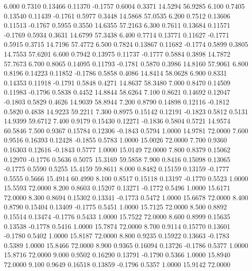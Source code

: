   6.000   0.7310   0.13466   0.11370  -0.1757   0.6004   0.3371  14.5294  56.9285
   6.100   0.7405   0.13540   0.11439  -0.1761   0.5977   0.3448  14.5868  57.0535
   6.200   0.7512   0.13606   0.11513  -0.1767   0.5955   0.3550  14.6355  57.2163
   6.300   0.7611   0.13684   0.11571  -0.1769   0.5934   0.3631  14.6799  57.3438
   6.400   0.7714   0.13771   0.11627  -0.1771   0.5915   0.3715  14.7196  57.4772
   6.500   0.7824   0.13867   0.11682  -0.1774   0.5899   0.3805  14.7553  57.6201
   6.600   0.7942   0.13975   0.11737  -0.1777   0.5884   0.3898  14.7872  57.7673
   6.700   0.8065   0.14095   0.11793  -0.1781   0.5870   0.3986  14.8160  57.9061
   6.800   0.8196   0.14223   0.11852  -0.1786   0.5858   0.4086  14.8414  58.0628
   6.900   0.8331   0.14353   0.11918  -0.1791   0.5848   0.4271  14.8637  58.3480
   7.000   0.8470   0.14509   0.11983  -0.1796   0.5838   0.4452  14.8844  58.6264
   7.100   0.8621   0.14692   0.12047  -0.1803   0.5829   0.4626  14.9039  58.8944
   7.200   0.8790   0.14898   0.12116  -0.1812   0.5820   0.4838  14.9223  59.2211
   7.300   0.8975   0.15142   0.12191  -0.1823   0.5812   0.5131  14.9399  59.6712
   7.400   0.9179   0.15430   0.12271  -0.1836   0.5804   0.5721  14.9574  60.5846
   7.500   0.9367   0.15784   0.12306  -0.1843   0.5794   1.0000  14.9781  72.0000
   7.600   0.9516   0.16393   0.12428  -0.1855   0.5783   1.0000  15.0026  72.0000
   7.700   0.9360   0.16303   0.12616  -0.1843   0.5777   1.0000  15.0149  72.0000
   7.800   0.8379   0.15062   0.12970  -0.1776   0.5636   0.5075  15.3169  59.5858
   7.900   0.8416   0.15098   0.13065  -0.1775   0.5590   0.5255  15.4159  59.8611
   8.000   0.8482   0.15159   0.13159  -0.1777   0.5555   0.5666  15.4914  60.4990
   8.100   0.8517   0.15118   0.13197  -0.1770   0.5523   1.0000  15.5593  72.0000
   8.200   0.8603   0.15207   0.13271  -0.1772   0.5496   1.0000  15.6171  72.0000
   8.300   0.8694   0.15302   0.13341  -0.1773   0.5472   1.0000  15.6678  72.0000
   8.400   0.8790   0.15404   0.13409  -0.1775   0.5451   1.0000  15.7125  72.0000
   8.500   0.8892   0.15514   0.13474  -0.1776   0.5433   1.0000  15.7522  72.0000
   8.600   0.8999   0.15635   0.13538  -0.1778   0.5416   1.0000  15.7874  72.0000
   8.700   0.9114   0.15770   0.13601  -0.1780   0.5402   1.0000  15.8187  72.0000
   8.800   0.9235   0.15922   0.13663  -0.1783   0.5389   1.0000  15.8466  72.0000
   8.900   0.9365   0.16094   0.13726  -0.1786   0.5377   1.0000  15.8716  72.0000
   9.000   0.9502   0.16290   0.13791  -0.1790   0.5366   1.0000  15.8940  72.0000
   9.100   0.9649   0.16518   0.13859  -0.1796   0.5357   1.0000  15.9142  72.0000
